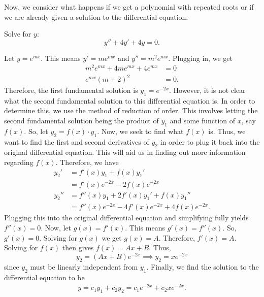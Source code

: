 Now, we consider what happens if we get a polynomial with repeated roots or
if we are already given a solution to the differential equation.
\begin{example}
    Solve for $y$: $$y''+4y'+4y=0.$$
\end{example}
\begin{soln}
    Let $y=e^{mx}$. This means $y'=me^{mx}$ and $y''=m^2e^{mx}$. Plugging in, 
    we get
    \begin{align*}
        m^2e^{mx}+4me^{mx}+4e^{mx} &= 0 \\
        e^{mx}(m+2)^2 &= 0.
    \end{align*}
    Therefore, the first fundamental solution is
    $y_1 = e^{-2x}$. However, it is not clear what the second fundamental solution
    to this differential equation is. In order to determine this, we use the method
    of \alert{reduction of order}. This involves letting the second fundamental
    solution being the product of $y_1$ and some function of $x$, say $f(x)$.
    So, let $y_2 = f(x)\cdot y_1$. Now, we seek to find what $f(x)$ is. Thus, 
    we want to find the first and second derivatives of $y_2$ in order to plug it
    back into the original differential equation. This will aid us in finding
    out more information regarding $f(x)$. Therefore, we have 
    \begin{align*}
        y_2' &= f'(x)y_1+f(x)y_1' \\
             &= f'(x)e^{-2x}-2f(x)e^{-2x}\\
        y_2'' &= f''(x)y_1+2f'(x)y_1'+f(x)y_1'' \\
              &= f''(x)e^{-2x}-4f'(x)e^{-2x}+4f(x)e^{-2x}.
    \end{align*}
    Plugging this into the original differential equation and simplifying fully
    yields $f''(x) = 0$.
    Now, let $g(x) = f'(x)$. This means $g'(x) = f''(x)$. So, $g'(x) = 0$. 
    Solving for $g(x)$ we get $g(x) = A$. Therefore, $f'(x) = A$. Solving for
    $f(x)$ then gives $f(x) = Ax + B$. Thus, 
    $$y_2 = (Ax+B)e^{-2x} \implies y_2 = xe^{-2x}$$
    since $y_2$ must be linearly independent from $y_1$.
    Finally, we find the solution to the differential equation to be
    \begin{align*}
        y = c_1y_1 + c_2y_2 = c_1e^{-2x} + c_2xe^{-2x}. 
    \end{align*}
\end{soln}
